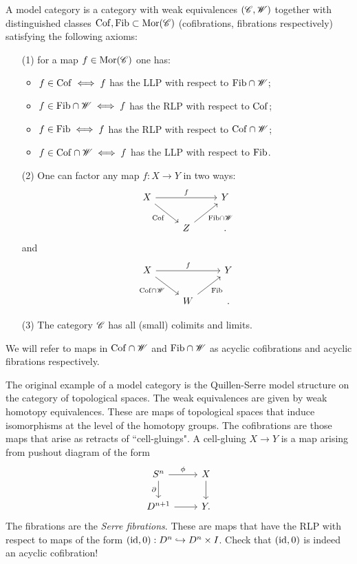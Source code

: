 \documentclass[11pt]{amsart}
\begin{document}
\begin{dfn}
A model category is a category with weak equivalences $(\mathscr C, \mathscr W)$ together with distinguished classes ${\rm Cof}, {\rm Fib} \subset {\rm Mor}(\mathscr C)$ (cofibrations, fibrations respectively) satisfying the following axioms:
\begin{enumerate}
\item[(1)] for a map $f \in {\rm Mor}(\mathscr C)$ one has:
\begin{itemize}
\item $f \in {\rm Cof} \iff f$ has the LLP with respect to ${\rm Fib} \cap \mathscr W$;
\item $f \in {\rm Fib} \cap \mathscr W \iff f$ has the RLP with respect to ${\rm Cof}$; 
\item $f \in {\rm Fib} \iff f$ has the RLP with respect to ${\rm Cof} \cap \mathscr W$;
\item $f \in {\rm Cof} \cap \mathscr W \iff f$ has the LLP with respect to ${\rm Fib}$. 
\end{itemize}
\item[(2)] One can factor any map $f : X \to Y$ in two ways:
\[
\begin{tikzcd}
X \ar[rr,"f"] \ar[dr, "{\rm Cof}"'] & & Y \\
& Z \ar[ur, "{\rm Fib} \cap \sW"'] & .
\end{tikzcd}
\]
and
\[
\begin{tikzcd}
X \ar[rr,"f"] \ar[dr, "{\rm Cof} \cap \sW"'] & & Y \\
& W \ar[ur, "{\rm Fib}"'] & .
\end{tikzcd}
\]
\item[(3)] The category $\mathscr C$ has all (small) colimits and limits. 
\end{enumerate}
\end{dfn}

\begin{rmk}
We will refer to maps in ${\rm Cof} \cap \mathscr W$ and ${\rm Fib} \cap \mathscr W$ as acyclic cofibrations and acyclic fibrations respectively. 
\end{rmk}

\begin{eg}
The original example of a model category is the Quillen-Serre model structure on the category of topological spaces. 
The weak equivalences are given by weak homotopy equivalences.
These are maps of topological spaces that induce isomorphisms at the level of the homotopy groups. 
The cofibrations are those maps that arise as retracts of ``cell-gluings".
A cell-gluing $X \to Y$ is a map arising from pushout diagram of the form
\[
\begin{tikzcd}
S^n \ar[r,"\phi"] \ar[d,"\partial"'] & X \ar[d] \\
D^{n+1} \ar[r] & Y  .
\end{tikzcd}
\] 
The fibrations are the {\em Serre fibrations}.
These are maps that have the RLP with respect to maps of the form $({\rm id}, 0) : D^n \hookrightarrow D^n \times I$. 
Check that $({\rm id},0)$ is indeed an acyclic cofibration!
\end{eg}
\end{document}
